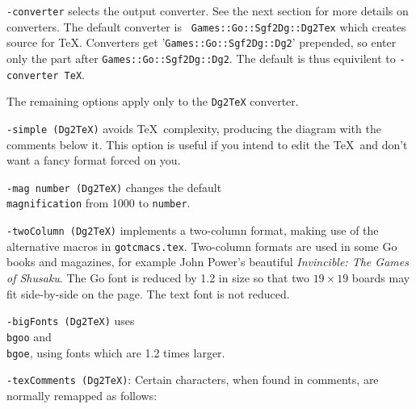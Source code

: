{\tt -converter} selects the output converter.  See the next section
for more details on converters.  The default converter is {\tt
Games::Go::Sgf2Dg::Dg2Tex} which creates source for \TeX.  Converters get
'{\tt Games::Go::Sgf2Dg::Dg2}' prepended, so enter only the part after {\tt Games::Go::Sgf2Dg::Dg2}.
The default is thus equivilent to {\tt -converter TeX}.

The remaining options apply only to the {\tt Dg2TeX} converter.

{\tt -simple (Dg2TeX)} avoids \TeX\ complexity, producing the diagram with
the comments below it. This option is useful if you intend to edit
the \TeX\ and don't want a fancy format forced on you.

{\tt -mag number (Dg2TeX)} changes the default {\tt \\magnification} from
1000 to {\tt number}.

{\tt -twoColumn (Dg2TeX)} implements a two-column format, making use of the alternative
macros in {\tt gotcmacs.tex}. Two-column formats are used in some Go books and
magazines, for example John Power's beautiful {\it Invincible: The Games of
Shusaku}. The Go font is reduced by 1.2 in size so that two $19\times 19$
boards may fit side-by-side on the page. The text font is not reduced.

{\tt -bigFonts (Dg2TeX)} uses {\tt \\bgoo} and {\tt \\bgoe}, using fonts which
are 1.2 times larger.

\vfil\eject  %
{\tt -texComments (Dg2TeX)}: Certain characters, when found in comments, are normally
remapped as follows:

\medbreak
\centerline{
\vbox{
\baselineskip=15pt
}}
\medbreak


